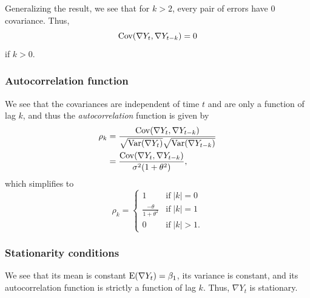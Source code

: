 \documentclass[
]{article}
\begin{document}
Generalizing the result, we see that for \(k > 2\), every pair of errors
have \(0\) covariance. Thus, \[
  \operatorname{Cov}(\nabla Y_t,\nabla Y_{t-k}) = 0
\] if \(k > 0\).

\hypertarget{autocorrelation-function}{%
\subsubsection{Autocorrelation
function}\label{autocorrelation-function}}

We see that the covariances are independent of time \(t\) and are only a
function of lag \(k\), and thus the \emph{autocorrelation} function is
given by \begin{align*}
  \rho_k
    &= \frac{\operatorname{Cov}(\nabla Y_t,\nabla Y_{t-k})}{\sqrt{\operatorname{Var}(\nabla Y_t)}\sqrt{\operatorname{Var}(\nabla Y_{t-k})}}\\
    &= \frac{\operatorname{Cov}(\nabla Y_t,\nabla Y_{t-k})}{\sigma^2(1+\theta^2)},
\end{align*} which simplifies to \[
  \rho_k =
  \begin{cases}
    1                             & \text{if}\; |k| = 0\\
    \frac{-\theta}{1+\theta^2}    & \text{if}\; |k| = 1\\
    0                             & \text{if}\; |k| > 1.
  \end{cases}
\]

\hypertarget{stationarity-conditions}{%
\subsubsection{Stationarity conditions}\label{stationarity-conditions}}

We see that its mean is constant \(\operatorname{E}(\nabla Y_t) = \beta_1\), its
variance is constant, and its autocorrelation function is strictly a
function of lag \(k\). Thus, \(\nabla Y_t\) is stationary.
\end{document}
